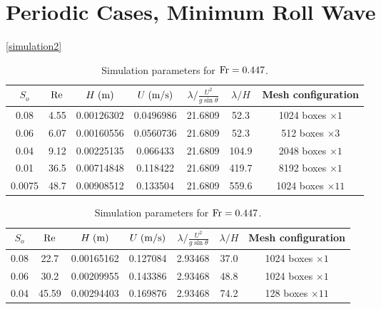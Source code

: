 \documentclass[a4paper]{article}
\newcommand{\fr}{{\rm{Fr}}}
\newcommand{\sa}{\sin\theta}
\begin{document}
\section{Periodic Cases, Minimum Roll Wave}
\autoref{simulation2}
\begin{table}[htbp]
	\begin{subtable}{1\textwidth}
		\centering
		\begin{tabular}{ccccccc}
			$S_o$ & $\rm Re$ & $H\;{\rm (m)}$ & $U\;{\rm (m/s)}$ & $\lambda/\frac{U^2}{g\sa}$ & $\lambda/H$ & Mesh configuration\\
			\toprule
			0.08 & 4.55 & $0.00126302$ & $0.0496986$ & 21.6809 & 52.3 & 1024 boxes $\times 1$\\
			
			0.06 & 6.07 & 0.00160556 & 0.0560736 & 21.6809 & 52.3 & 512 boxes $\times 3$\\
			
			0.04 & 9.12 & 0.00225135 & 0.066433 & 21.6809 & 104.9 & 2048 boxes $\times 1$\\
			
			0.01 & 36.5 & 0.00714848 & 0.118422 & 21.6809 & 419.7 & 8192 boxes $\times 1$\\
			
			0.0075 & 48.7 & 0.00908512 & 0.133504 & 21.6809 & 559.6 & 1024 boxes $\times 11$\\
			
			\bottomrule 
		\end{tabular}
		\caption{Simulation parameters for $\fr=0.447$.}
		\label{params_0447}
	\end{subtable}
	
	\vspace{0.25cm}
	
	\begin{subtable}{1\textwidth}
		\centering
		\begin{tabular}{ccccccc}
			$S_o$ & $\rm Re$ & $H\;{\rm (m)}$ & $U\;{\rm (m/s)}$ & $\lambda/\frac{U^2}{g\sa}$ & $\lambda/H$ & Mesh configuration\\
			\toprule
			0.08 & 22.7 & 0.00165162 & 0.127084 & 2.93468 & 37.0 & 1024 boxes $\times 1$\\
			
			0.06 & 30.2 & 0.00209955 & 0.143386 & 2.93468 & 48.8 & 1024 boxes $\times 1$\\
			
			0.04 & 45.59 & 0.00294403 & 0.169876 & 2.93468 & 74.2 & 128 boxes $\times 11$\\
			

\end{tabular}
\end{subtable}
\end{table}
\end{document}
